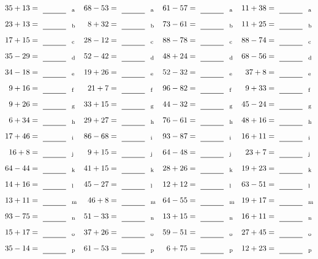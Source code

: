 \documentclass
[
  draft    = true,
  fontsize = 11pt,
  parskip  = half-
]
{scrartcl}
\begin{document}
\clearpage
\begin{align*}
    \pline{35+13}&=\rline{a}
  & \pline{68-53}&=\rline{a}
  & \pline{61-57}&=\rline{a}
  & \pline{11+38}&=\rline{a} \\[1ex]
    \pline{23+13}&=\rline{b}
  & \pline{8+32}&=\rline{b}
  & \pline{73-61}&=\rline{b}
  & \pline{11+25}&=\rline{b} \\[1ex]
    \pline{17+15}&=\rline{c}
  & \pline{28-12}&=\rline{c}
  & \pline{88-78}&=\rline{c}
  & \pline{88-74}&=\rline{c} \\[1ex]
    \pline{35-29}&=\rline{d}
  & \pline{52-42}&=\rline{d}
  & \pline{48+24}&=\rline{d}
  & \pline{68-56}&=\rline{d} \\[1ex]
    \pline{34-18}&=\rline{e}
  & \pline{19+26}&=\rline{e}
  & \pline{52-32}&=\rline{e}
  & \pline{37+8}&=\rline{e} \\[1ex]
    \pline{9+16}&=\rline{f}
  & \pline{21+7}&=\rline{f}
  & \pline{96-82}&=\rline{f}
  & \pline{9+33}&=\rline{f} \\[1ex]
    \pline{9+26}&=\rline{g}
  & \pline{33+15}&=\rline{g}
  & \pline{44-32}&=\rline{g}
  & \pline{45-24}&=\rline{g} \\[1ex]
    \pline{6+34}&=\rline{h}
  & \pline{29+27}&=\rline{h}
  & \pline{76-61}&=\rline{h}
  & \pline{48+16}&=\rline{h} \\[1ex]
    \pline{17+46}&=\rline{i}
  & \pline{86-68}&=\rline{i}
  & \pline{93-87}&=\rline{i}
  & \pline{16+11}&=\rline{i} \\[1ex]
    \pline{16+8}&=\rline{j}
  & \pline{9+15}&=\rline{j}
  & \pline{64-48}&=\rline{j}
  & \pline{23+7}&=\rline{j} \\[1ex]
    \pline{64-44}&=\rline{k}
  & \pline{41+15}&=\rline{k}
  & \pline{28+26}&=\rline{k}
  & \pline{19+23}&=\rline{k} \\[1ex]
    \pline{14+16}&=\rline{l}
  & \pline{45-27}&=\rline{l}
  & \pline{12+12}&=\rline{l}
  & \pline{63-51}&=\rline{l} \\[1ex]
    \pline{13+11}&=\rline{m}
  & \pline{46+8}&=\rline{m}
  & \pline{64-55}&=\rline{m}
  & \pline{19+17}&=\rline{m} \\[1ex]
    \pline{93-75}&=\rline{n}
  & \pline{51-33}&=\rline{n}
  & \pline{13+15}&=\rline{n}
  & \pline{16+11}&=\rline{n} \\[1ex]
    \pline{15+17}&=\rline{o}
  & \pline{37+26}&=\rline{o}
  & \pline{59-51}&=\rline{o}
  & \pline{27+45}&=\rline{o} \\[1ex]
    \pline{35-14}&=\rline{p}
  & \pline{61-53}&=\rline{p}
  & \pline{6+75}&=\rline{p}
  & \pline{12+23}&=\rline{p}
\end{align*}
\end{document}
